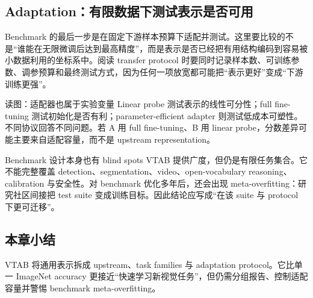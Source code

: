 \subsection{Adaptation：有限数据下测试表示是否可用}

Benchmark 的最后一步是在固定下游样本预算下适配并测试。这里要比较的不是“谁能在无限微调后达到最高精度”，而是表示是否已经把有用结构编码到容易被小数据利用的坐标系中。阅读 transfer protocol 时要同时记录样本数、可训练参数、调参预算和最终测试方式，因为任何一项放宽都可能把“表示更好”变成“下游训练更强”。


\begin{knowledgebox}{读图：适配器也属于实验变量}
Linear probe 测试表示的线性可分性；full fine-tuning 测试初始化是否有利；parameter-efficient adapter 则测试低成本可塑性。不同协议回答不同问题。若 A 用 full fine-tuning、B 用 linear probe，分数差异可能主要来自适配容量，而不是 upstream representation。
\end{knowledgebox}

\begin{warningbox}{Benchmark 设计本身也有 blind spots}
VTAB 提供广度，但仍是有限任务集合。它不能完整覆盖 detection、segmentation、video、open-vocabulary reasoning、calibration 与安全性。对 benchmark 优化多年后，还会出现 meta-overfitting：研究社区间接把 test suite 变成训练目标。因此结论应写成“在该 suite 与 protocol 下更可迁移”。
\end{warningbox}


\subsection{本章小结}

VTAB 将通用表示拆成 upstream、task families 与 adaptation protocol。它比单一 ImageNet accuracy 更接近“快速学习新视觉任务”，但仍需分组报告、控制适配容量并警惕 benchmark meta-overfitting。

